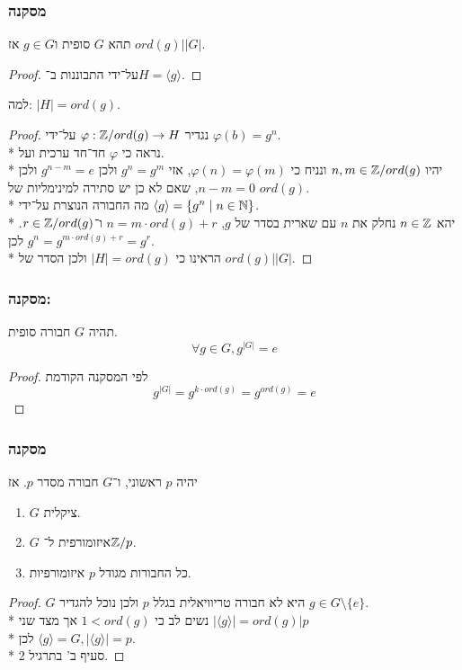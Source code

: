 \subsubsection{מסקנה}
תהא $G$ סופית ו$g \in G$ אז $ord(g) \Big| |G|$.
\begin{proof}
	על־ידי התבוננות ב־$H = \langle g \rangle$.
\end{proof}
למה: $|H| = ord(g)$.
\begin{proof}
	נגדיר $\varphi : \mathbb{Z}/ord(g) \to H$ על־ידי $\varphi(b) = g^n$. \\*
	נראה כי $\varphi$ חד־חד ערכית ועל. \\*
	יהיו $n, m \in \mathbb{Z}/ord(g)$ ונניח כי $\varphi(n) = \varphi(m)$, אזי $g^n = g^m$ ולכן $g^{n - m} = e$ ולכן $n - m = 0$, שאם לא כן יש סתירה למינימליות של $ord(g)$. \\*
	מה החבורה הנוצרת על־ידי $\langle g \rangle = \{ g^n \mid n \in \mathbb{N}\}$. \\*
	יהא $n \in \mathbb{Z}$ נחלק את $n$ עם שארית בסדר של $g$, $n = m \cdot ord(g) + r$ ו־$r \in \mathbb{Z}/ord(g)$. לכן $g^n = g^{m \cdot ord(g) + r} = g^r$. \\*
	הראינו כי $|H| = ord(g)$ ולכן הסדר של $ord(g) \Big| |G|$.
\end{proof}

\subsubsection{מסקנה: }
תהיה $G$ חבורה סופית.
\[
	\forall g \in G, g^{|G|} = e
\]
\begin{proof}
	לפי המסקנה הקודמת
	\[
		g^{|G|} = g^{k \cdot ord(g)} = g^{ord(g)} = e
	\]
\end{proof}

\subsubsection{מסקנה}
יהיה $p$ ראשוני, ו־$G$ חבורה מסדר $p$. אז
\begin{enumerate}
	\item $G$ ציקלית.
	\item $G$ איזומורפית ל־$\mathbb{Z}/p$.
	\item כל החבורות מגודל $p$ איזומורפיות.
\end{enumerate}
\begin{proof}
	$G$ היא לא חבורה טריוויאלית בגלל $p$ ולכן נוכל להגדיר $g \in G \setminus \{e\}$. \\*
	נשים לב כי $1 < ord(g)$ אך מצד שני $|\langle g \rangle| = ord(g) \big|p$ \\*
	לכן $\langle g \rangle = G, |\langle g \rangle| = p$. \\*
	סעיף ב' בתרגיל 2.
\end{proof}

